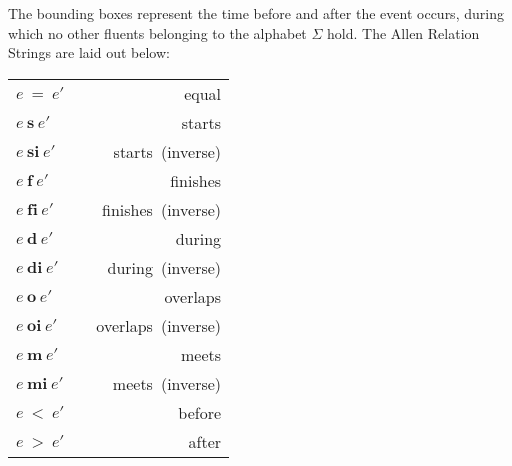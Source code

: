 \documentclass[a4paper,11pt]{article}
\newcommand{\vph}[1]{\vphantom{#1}}
\begin{document}
The bounding boxes represent the time 
before and after the event occurs, during which no other fluents belonging to 
the alphabet $\Sigma$ 
hold. The 
Allen Relation Strings are laid out 
below:
\begin{center}
	\begin{tabular}{ l@{\hskip 1in}c@{\hskip 1in}r }
		$e~\mathbf{=}~e'$ & \fbox{\vph{$e'\vph{,e'}$}}\fbox{$e, 	
		e'\vph{e'}$}\fbox{\vph{$,e'$}} & equal\\[0.6em]		
		$e~\mathbf{s}~e'$ & \fbox{\vph{$e'\vph{,e'}$}}\fbox{$e, 
		e'\vph{e'}$}\fbox{$e'\vph{,e'}$}\fbox{\vph{$,e'$}} & starts\\[0.6em]
		$e~\mathbf{si}~e'$ & \fbox{\vph{$e'\vph{,e'}$}}\fbox{$e, 		
		e'\vph{e'}$}\fbox{$e\vph{,e'}$}\fbox{\vph{$,e'$}} & 		
		starts~(inverse)\\[0.6em]
		$e~\mathbf{f}~e'$ & \fbox{\vph{$e'\vph{,e'}$}}\fbox{$ 		
		e'\vph{,e'}$}\fbox{$e, e'\vph{,e'}$}\fbox{\vph{$,e'$}} & 		
		finishes\\[0.6em]
		$e~\mathbf{fi}~e'$ & \fbox{\vph{$e'\vph{,e'}$}}\fbox{$ 		
		e\vph{,e'}$}\fbox{$e, e'\vph{,e'}$}\fbox{\vph{$,e'$}} &		
		finishes~(inverse)\\[0.6em]
		$e~\mathbf{d}~e'$ & \fbox{\vph{$,e'$}}\fbox{$ e'\vph{,e'}$}\fbox{$e, 
		e'\vph{,e'}$}\fbox{$ e'\vph{,e'}$}\fbox{\vph{$,e'$}} & during\\[0.6em]
		$e~\mathbf{di}~e'$ & \fbox{\vph{$e'\vph{,e'}$}}\fbox{$ 
		e\vph{,e'}$}\fbox{$e, e'\vph{,e'}$}\fbox{$ 
		e\vph{,e'}$}\fbox{\vph{$,e'$}} & during~(inverse)\\[0.6em]
		$e~\mathbf{o}~e'$ & \fbox{\vph{$,e'$}}\fbox{$ e\vph{,e'}$}\fbox{$e, 
		e'\vph{,e'}$}\fbox{$ e'\vph{,e'}$}\fbox{\vph{$,e'$}} & 
		overlaps\\[0.6em]
		$e~\mathbf{oi}~e'$ & \fbox{\vph{$e'\vph{,e'}$}}\fbox{$ 
		e'\vph{,e'}$}\fbox{$e, e'\vph{,e'}$}\fbox{$ 
		e\vph{,e'}$}\fbox{\vph{$,e'$}} & overlaps~(inverse)\\[0.6em]
		$e~\mathbf{m}~e'$ & \fbox{\vph{$,e'$}}\fbox{$ e\vph{,e'}$}\fbox{$ 
		e'\vph{,e'}$}\fbox{\vph{$,e'$}} & meets\\[0.6em]
		$e~\mathbf{mi}~e'$ & \fbox{\vph{$e'\vph{,e'}$}}\fbox{$ 
		e'\vph{,e'}$}\fbox{$ e\vph{,e'}$}\fbox{\vph{$,e'$}} & 
		meets~(inverse)\\[0.6em]
		$e~\mathbf{<}~e'$ & \fbox{\vph{$,e'$}}\fbox{$ 
		e\vph{,e'}$}\fbox{$\vph{,e'}$}\fbox{$ e'\vph{,e'}$}\fbox{\vph{$,e'$}} & 
		before\\[0.6em]
		$e~\mathbf{>}~e'$ & \fbox{\vph{$e'\vph{,e'}$}}\fbox{$ 
		e'\vph{,e'}$}\fbox{$\vph{,e'}$}\fbox{$ e\vph{,e'}$}\fbox{\vph{$,e'$}} & 
		after
	\end{tabular}
\end{center}
\end{document}

